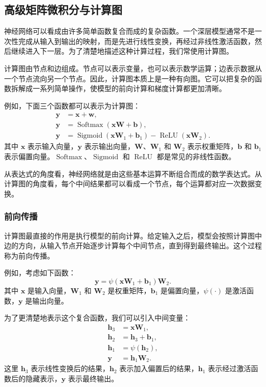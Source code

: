 \subsection{高级矩阵微积分与计算图}

神经网络可以看成由许多简单函数复合而成的复杂函数。一个深层模型通常不是一次性完成从输入到输出的映射，而是先进行线性变换，再经过非线性激活函数，然后继续进入下一层。为了清楚地描述这种计算过程，我们常使用计算图。

计算图由节点和边组成。节点可以表示变量，也可以表示数学运算；边表示数据从一个节点流向另一个节点。因此，计算图本质上是一种有向图。它可以把复杂的函数拆解成一系列简单操作，使模型的前向计算和梯度计算都更加清晰。

例如，下面三个函数都可以表示为计算图：
\begin{align}
  \mathbf{y}
  &= \mathbf{x} + \mathbf{w},\\
  \mathbf{y}
  &= \operatorname{Softmax}(\mathbf{x}\mathbf{W}+\mathbf{b}),\\
  \mathbf{y}
  &=
  \operatorname{Sigmoid}(\mathbf{x}\mathbf{W}_1+\mathbf{b}_1)
  -
  \operatorname{ReLU}(\mathbf{x}\mathbf{W}_2).
\end{align}
其中 $\mathbf{x}$ 表示输入向量，$\mathbf{y}$ 表示输出向量，$\mathbf{W}$、$\mathbf{W}_1$ 和 $\mathbf{W}_2$ 表示权重矩阵，$\mathbf{b}$ 和 $\mathbf{b}_1$ 表示偏置向量。$\operatorname{Softmax}$、$\operatorname{Sigmoid}$ 和 $\operatorname{ReLU}$ 都是常见的非线性函数。

从表达式的角度看，神经网络就是由这些基本运算不断组合而成的数学表达式。从计算图的角度看，每个中间结果都可以看成一个节点，每个运算都对应一次数据变换。


\subsubsection{前向传播}

计算图最直接的作用是执行模型的前向计算。给定输入之后，模型会按照计算图中边的方向，从输入节点开始逐步计算每个中间节点，直到得到最终输出。这个过程称为前向传播。

例如，考虑如下函数：
\begin{equation}
  \mathbf{y}
  =
  \psi(\mathbf{x}\mathbf{W}_1+\mathbf{b}_1)\mathbf{W}_2.
\end{equation}
其中 $\mathbf{x}$ 是输入向量，$\mathbf{W}_1$ 和 $\mathbf{W}_2$ 是权重矩阵，$\mathbf{b}_1$ 是偏置向量，$\psi(\cdot)$ 是激活函数，$\mathbf{y}$ 是输出向量。

为了更清楚地表示这个复合函数，我们可以引入中间变量：
\begin{align}
  \mathbf{h}_3 &= \mathbf{x}\mathbf{W}_1,\\
  \mathbf{h}_2 &= \mathbf{h}_3+\mathbf{b}_1,\\
  \mathbf{h}_1 &= \psi(\mathbf{h}_2),\\
  \mathbf{y} &= \mathbf{h}_1\mathbf{W}_2.
\end{align}
这里 $\mathbf{h}_3$ 表示线性变换后的结果，$\mathbf{h}_2$ 表示加入偏置后的结果，$\mathbf{h}_1$ 表示经过激活函数后的隐藏表示，$\mathbf{y}$ 表示最终输出。

